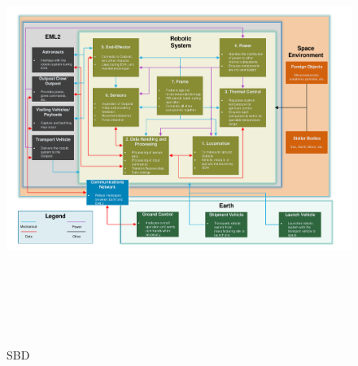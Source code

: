 \begin{figure}[H]
\centering
\includegraphics[width=9in, height=5.5in, keepaspectratio]{Figures/SBD}
\caption{\acrlong{SBD}}
\label{fig:SBD}
\end{figure}
